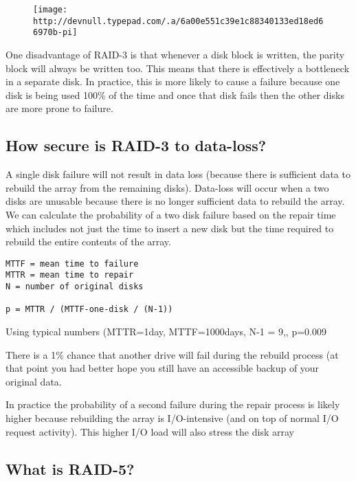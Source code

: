 \begin{figure}[htbp]
\centering
\texttt{[image: http://devnull.typepad.com/.a/6a00e551c39e1c88340133ed18ed66970b-pi]}
\caption{}
\end{figure}

One disadvantage of RAID-3 is that whenever a disk block is written, the parity block will always be written too. This means that there is effectively a bottleneck in a separate disk. In practice, this is more likely to cause a failure because one disk is being used 100\% of the time and once that disk fails then the other disks are more prone to failure.

\subsection{How secure is RAID-3 to data-loss?}\label{how-secure-is-raid-3-to-data-loss}

A single disk failure will not result in data loss (because there is sufficient data to rebuild the array from the remaining disks). Data-loss will occur when a two disks are unusable because there is no longer sufficient data to rebuild the array. We can calculate the probability of a two disk failure based on the repair time which includes not just the time to insert a new disk but the time required to rebuild the entire contents of the array.

\begin{lstlisting}
MTTF = mean time to failure
MTTR = mean time to repair
N = number of original disks

p = MTTR / (MTTF-one-disk / (N-1))
\end{lstlisting}

Using typical numbers (MTTR=1day, MTTF=1000days, N-1 = 9,, p=0.009

There is a 1\% chance that another drive will fail during the rebuild process (at that point you had better hope you still have an accessible backup of your original data.

In practice the probability of a second failure during the repair process is likely higher because rebuilding the array is I/O-intensive (and on top of normal I/O request activity). This higher I/O load will also stress the disk array

\subsection{What is RAID-5?}\label{what-is-raid-5}

